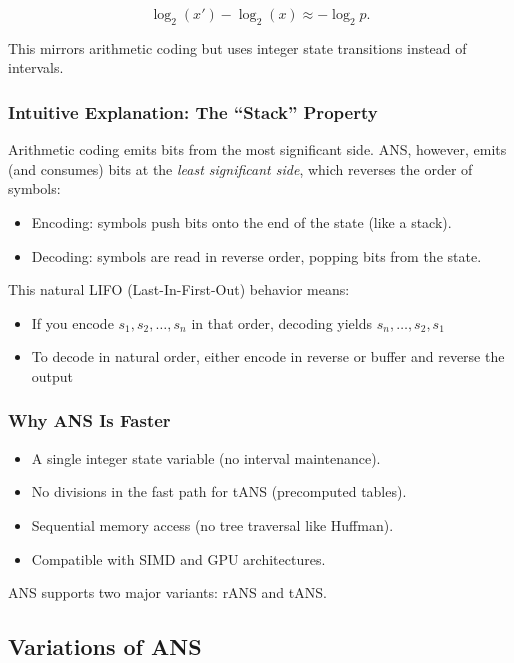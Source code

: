 \[
\log_2(x') - \log_2(x) \approx -\log_2 p.
\]

This mirrors arithmetic coding but uses integer state transitions instead of intervals.

\subsubsection{Intuitive Explanation: The ``Stack'' Property}

Arithmetic coding emits bits from the most significant side.  
ANS, however, emits (and consumes) bits at the \emph{least significant side}, which reverses the order of symbols:

\begin{itemize}
    \item Encoding: symbols push bits onto the end of the state (like a stack).
    \item Decoding: symbols are read in reverse order, popping bits from the state.
\end{itemize}

This natural LIFO (Last-In-First-Out) behavior means:
\begin{itemize}
    \item If you encode $s_1, s_2, \ldots, s_n$ in that order, decoding yields $s_n, \ldots, s_2, s_1$
    \item To decode in natural order, either encode in reverse or buffer and reverse the output
\end{itemize}

\subsubsection{Why ANS Is Faster}

\begin{itemize}
    \item A single integer state variable (no interval maintenance).
    \item No divisions in the fast path for tANS (precomputed tables).
    \item Sequential memory access (no tree traversal like Huffman).
    \item Compatible with SIMD and GPU architectures.
\end{itemize}

ANS supports two major variants: rANS and tANS.

\subsection{Variations of ANS}


